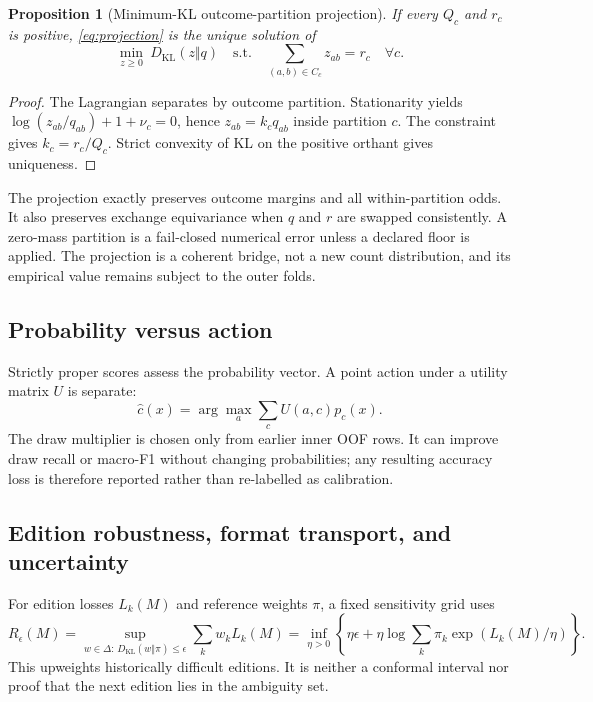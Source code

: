 \documentclass[11pt]{article}
\newtheorem{proposition}{Proposition}
\newcommand{\KL}{D_{\mathrm{KL}}}
\begin{document}
\begin{proposition}[Minimum-KL outcome-partition projection]
If every $Q_c$ and $r_c$ is positive, \cref{eq:projection} is the unique solution of
\begin{equation}
 \min_{z\ge 0}\ \KL(z\Vert q)
 \quad\text{s.t.}\quad \sum_{(a,b)\in C_c}z_{ab}=r_c\quad\forall c.
\end{equation}
\end{proposition}

\begin{proof}
The Lagrangian separates by outcome partition.  Stationarity yields
$\log(z_{ab}/q_{ab})+1+\nu_c=0$, hence $z_{ab}=k_cq_{ab}$ inside partition $c$.  The constraint gives
$k_c=r_c/Q_c$.  Strict convexity of KL on the positive orthant gives uniqueness.
\end{proof}

The projection exactly preserves outcome margins and all within-partition odds.  It also preserves
exchange equivariance when $q$ and $r$ are swapped consistently.  A zero-mass partition is a
fail-closed numerical error unless a declared floor is applied.  The projection is a coherent
bridge, not a new count distribution, and its empirical value remains subject to the outer folds.

\subsection{Probability versus action}

Strictly proper scores assess the probability vector.  A point action under a utility matrix $U$
is separate:
\begin{equation}
 \widehat c(x)=\arg\max_a\sum_c U(a,c)p_c(x).
\end{equation}
The draw multiplier is chosen only from earlier inner OOF rows.  It can improve draw recall or
macro-F1 without changing probabilities; any resulting accuracy loss is therefore reported rather
than re-labelled as calibration.

\subsection{Edition robustness, format transport, and uncertainty}

For edition losses $L_k(M)$ and reference weights $\pi$, a fixed sensitivity grid uses
\begin{equation}
 R_\epsilon(M)=\sup_{w\in\Delta:\,\KL(w\Vert\pi)\le\epsilon}\sum_kw_kL_k(M)
 =\inf_{\eta>0}\left\{\eta\epsilon+
 \eta\log\sum_k\pi_k\exp(L_k(M)/\eta)\right\}.
\end{equation}
This upweights historically difficult editions.  It is neither a conformal interval nor proof that
the next edition lies in the ambiguity set.
\end{document}
